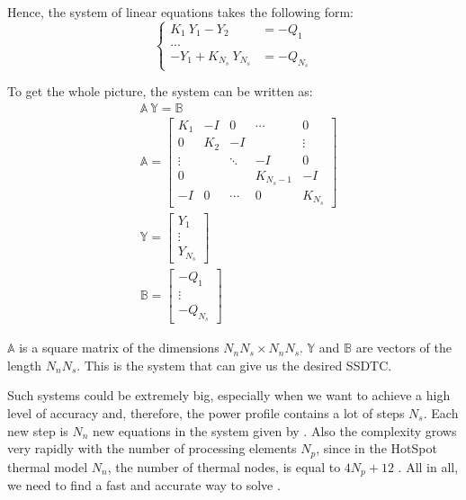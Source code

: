 Hence, the system of linear equations takes the following form:
\[
  \begin{cases}
    K_1 \: Y_1 - Y_2 & = -Q_1 \\
    ... \\
    -Y_1 + K_{N_s} \: Y_{N_s} & = -Q_{N_s}
  \end{cases}
\]

To get the whole picture, the system can be written as:
\begin{align}
  & \mathbb{A} \: \mathbb{Y} = \mathbb{B} \label{eq:system} \\
  & \mathbb{A} = \left[
    \begin{array}{ccccc}
      K_1 & -I & 0 & \cdots & 0 \\
      0 & K_2 & -I &  & \vdots \\
      \vdots &  & \ddots & -I & 0 \\
      0 &  &  & K_{N_s - 1} & -I \\
      -I & 0 & \cdots & 0 & K_{N_s}
    \end{array}
  \right] \nonumber \\
  & \mathbb{Y} = \left[
    \begin{array}{c}
      Y_1 \\
      \vdots \\
      Y_{N_s}
    \end{array}
  \right] \nonumber \\
  & \mathbb{B} = \left[
    \begin{array}{c}
      -Q_1 \\
      \vdots \\
      -Q_{N_s}
    \end{array}
  \right] \nonumber
\end{align}

$\mathbb{A}$ is a square matrix of the dimensions $N_n N_s \times N_n N_s$. $\mathbb{Y}$ and $\mathbb{B}$ are vectors of the length $N_n N_s$. This is the system that can give us the desired SSDTC.

Such systems could be extremely big, especially when we want to achieve a high level of accuracy and, therefore, the power profile contains a lot of steps $N_s$. Each new step is $N_n$ new equations in the system given by . Also the complexity grows very rapidly with the number of processing elements $N_p$, since in the HotSpot thermal model $N_n$, the number of thermal nodes, is equal to $4 N_p + 12$ \cite{rao2008}. All in all, we need to find a fast and accurate way to solve .

